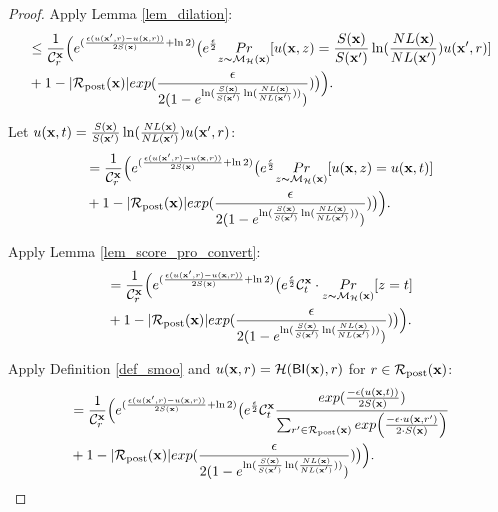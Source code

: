 \documentclass{article}
\begin{document}
\begin{proof}
      Apply Lemma \ref{lem_dilation}:
      \begin{equation*}
      \begin{split}
      & \leq \frac{1}{\mathcal{C}^{\textbf{x}}_{r}} \Big( e^{(\frac{\epsilon (u(\textbf{x}', {r}) - u(\textbf{x}, {r}))}{2 S(\textbf{x})} + \ln 2)} 
      \big( e^{\frac{\epsilon}{2}}
      \underset{z \thicksim \mathcal{M}_{\mathcal{H}}(\textbf{x})}{Pr}[u(\textbf{x}, {z}) = \frac{S(\textbf{x})}{S(\textbf{x}')} \ln(\frac{NL(\textbf{x})}{NL(\textbf{x}')}) u(\textbf{x}', {r}) ] \\
      & + 1 - |\mathcal{R}_{\textup{post}}(\textbf{x})|exp(\frac{\epsilon}{2 (1 - e ^ {\ln(\frac{S(\textbf{x})}{S(\textbf{x}')} \ln(\frac{NL(\textbf{x})}{NL(\textbf{x}')}))})}) 
      \big ) \Big).
      \end{split}
      \end{equation*}

      Let $u(\textbf{x}, {t}) = \frac{S(\textbf{x})}{S(\textbf{x}')} \ln(\frac{NL(\textbf{x})}{NL(\textbf{x}')}) u(\textbf{x}', {r})$:      
      \begin{equation*}
      \begin{split}
      & = \frac{1}{\mathcal{C}^{\textbf{x}}_{r}} \Big( e^{(\frac{\epsilon (u(\textbf{x}', {r}) - u(\textbf{x}, {r}))}{2 S(\textbf{x})} + \ln 2)} 
      \big( e^{\frac{\epsilon}{2}}
      \underset{z \thicksim \mathcal{M}_{\mathcal{H}}(\textbf{x})}{Pr}[u(\textbf{x}, {z}) = u(\textbf{x}, {t}) ] \\
      & + 1 - |\mathcal{R}_{\textup{post}}(\textbf{x})|exp(\frac{\epsilon}{2 (1 - e ^ {\ln(\frac{S(\textbf{x})}{S(\textbf{x}')} \ln(\frac{NL(\textbf{x})}{NL(\textbf{x}')}))})}) 
      \big ) \Big).
      \end{split}
      \end{equation*}

      Apply Lemma \ref{lem_score_pro_convert}:
      \begin{equation*}
      \begin{split}
      & = \frac{1}{\mathcal{C}^{\textbf{x}}_{r}} \Big( e^{(\frac{\epsilon (u(\textbf{x}', {r}) - u(\textbf{x}, {r}))}{2 S(\textbf{x})} + \ln 2)} 
      \big( e^{\frac{\epsilon}{2}}
      \mathcal{C}^{\textbf{x}}_{t} \cdot \underset{z \thicksim \mathcal{M}_{\mathcal{H}}(\textbf{x})}{Pr}[z = t ] \\
      & + 1 - |\mathcal{R}_{\textup{post}}(\textbf{x})|exp(\frac{\epsilon}{2 (1 - e ^ {\ln(\frac{S(\textbf{x})}{S(\textbf{x}')} \ln(\frac{NL(\textbf{x})}{NL(\textbf{x}')}))})}) 
      \big ) \Big).
      \end{split}
      \end{equation*}

      Apply Definition \ref{def_smoo} and $u(\textbf{x}, {r}) = \mathcal{H}(\mathsf{BI}(\textbf{x}),r)$ for $r \in \mathcal{R}_{\textup{post}}(\textbf{x})$:
      \begin{equation*}
      \begin{split}          
      & = \frac{1}{\mathcal{C}^{\textbf{x}}_{r}} \Big( e^{(\frac{\epsilon (u(\textbf{x}', {r}) - u(\textbf{x}, {r}))}{2 S(\textbf{x})} + \ln 2)} 
      \big( e^{\frac{\epsilon}{2}}
      \mathcal{C}^{\textbf{x}}_{t}  \frac{exp(\frac{-\epsilon (u(\textbf{x}, {t}))}{2 S(\textbf{x})})}{\sum_{r'\in \mathcal{R}_{\textup{post}}(\textbf{x})} exp \Big(\frac{-\epsilon\cdot u(\textbf{\textbf{x}}, r')}{2 \cdot S(\textbf{x})}\Big)}\\
      & + 1 - |\mathcal{R}_{\textup{post}}(\textbf{x})|exp(\frac{\epsilon}{2 (1 - e ^ {\ln(\frac{S(\textbf{x})}{S(\textbf{x}')} \ln(\frac{NL(\textbf{x})}{NL(\textbf{x}')}))})}) 
      \big ) \Big).
      \end{split}
      \end{equation*}


\end{proof}
\end{document}
